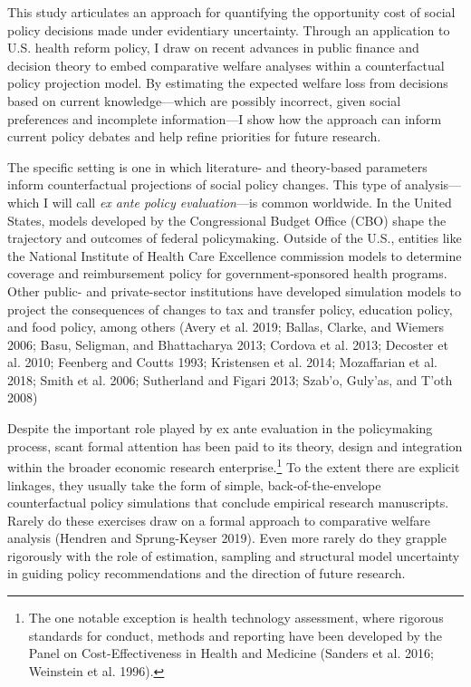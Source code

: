 \documentclass[
  10pt,
]{article}
\begin{document}
\setlength\parindent{24pt}

This study articulates an approach for quantifying the opportunity cost
of social policy decisions made under evidentiary uncertainty. Through
an application to U.S. health reform policy, I draw on recent advances
in public finance and decision theory to embed comparative welfare
analyses within a counterfactual policy projection model. By estimating
the expected welfare loss from decisions based on current
knowledge---which are possibly incorrect, given social preferences and
incomplete information---I show how the approach can inform current
policy debates and help refine priorities for future research.

The specific setting is one in which literature- and theory-based
parameters inform counterfactual projections of social policy changes.
This type of analysis---which I will call \emph{ex ante policy
evaluation}---is common worldwide. In the United States, models
developed by the Congressional Budget Office (CBO) shape the trajectory
and outcomes of federal policymaking. Outside of the U.S., entities like
the National Institute of Health Care Excellence commission models to
determine coverage and reimbursement policy for government-sponsored
health programs. Other public- and private-sector institutions have
developed simulation models to project the consequences of changes to
tax and transfer policy, education policy, and food policy, among others
(Avery et al. 2019; Ballas, Clarke, and Wiemers 2006; Basu, Seligman,
and Bhattacharya 2013; Cordova et al. 2013; Decoster et al. 2010;
Feenberg and Coutts 1993; Kristensen et al. 2014; Mozaffarian et al.
2018; Smith et al. 2006; Sutherland and Figari 2013; Szab\a'o,
Guly\a'as, and T\a'oth 2008)

Despite the important role played by ex ante evaluation in the
policymaking process, scant formal attention has been paid to its
theory, design and integration within the broader economic research
enterprise.\footnote{The one notable exception is health technology
  assessment, where rigorous standards for conduct, methods and
  reporting have been developed by the Panel on Cost-Effectiveness in
  Health and Medicine (Sanders et al. 2016; Weinstein et al. 1996).} To
the extent there are explicit linkages, they usually take the form of
simple, back-of-the-envelope counterfactual policy simulations that
conclude empirical research manuscripts. Rarely do these exercises draw
on a formal approach to comparative welfare analysis (Hendren and
Sprung-Keyser 2019). Even more rarely do they grapple rigorously with
the role of estimation, sampling and structural model uncertainty in
guiding policy recommendations and the direction of future research.
\end{document}
